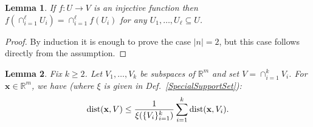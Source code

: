 \documentclass[9pt,twocolumn]{pnas-new}
\newtheorem{lemma}{Lemma}
\begin{document}
\begin{lemma}\label{spanIntersectionLemma}
If $f: U \to V$ is an injective function then $f\left(\cap_{i=1}^\ell U_i \right) =  \cap_{i=1}^\ell f\left(U_i\right)$ for any $U_1, \ldots, U_\ell \subseteq U$.
\end{lemma}
\begin{proof}
By induction it is enough to prove the case $|n| = 2$, but this case follows directly from the assumption. %
\end{proof}
\begin{lemma}\label{DistanceToIntersectionLemma}
Fix $k \geq 2$. Let $V_1, \ldots, V_k$ be subspaces of $\mathbb{R}^m$ and set $V = \cap_{i = 1}^k V_i$. For  $\mathbf{x} \in \mathbb{R}^m$, we have (where $\xi$ is given in Def.~\ref{SpecialSupportSet}):
\vspace{-.2 cm}
\begin{align}\label{DTILeq}
\text{\rm dist}(\mathbf{x}, V) \leq \frac{1}{\xi(\{V_i\}_{i = 1}^k)} \sum_{i=1}^k \text{\rm dist}(\mathbf{x}, V_i).
\end{align}
\end{lemma}
\end{document}
